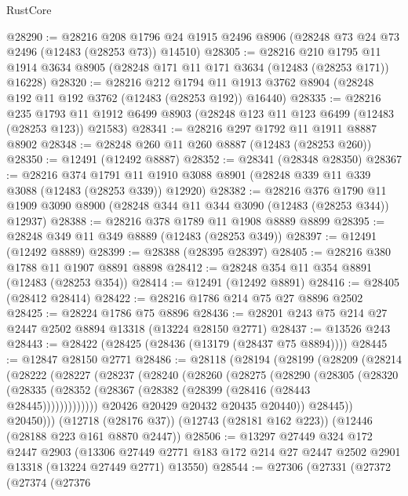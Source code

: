 \begin{lexlean}{RustCore}
\begin{coremodule}
@28290 := @28216
    @208
    @1796
    @24
    @1915
    @2496
    @8906
    (@28248 @73 @24 @73 @2496 (@12483 (@28253 @73)) @14510)
@28305 := @28216
    @210
    @1795
    @11
    @1914
    @3634
    @8905
    (@28248 @171 @11 @171 @3634 (@12483 (@28253 @171)) @16228)
@28320 := @28216
    @212
    @1794
    @11
    @1913
    @3762
    @8904
    (@28248 @192 @11 @192 @3762 (@12483 (@28253 @192)) @16440)
@28335 := @28216
    @235
    @1793
    @11
    @1912
    @6499
    @8903
    (@28248 @123 @11 @123 @6499 (@12483 (@28253 @123)) @21583)
@28341 := @28216 @297 @1792 @11 @1911 @8887 @8902
@28348 := @28248 @260 @11 @260 @8887 (@12483 (@28253 @260))
@28350 := @12491 (@12492 @8887)
@28352 := @28341 (@28348 @28350)
@28367 := @28216
    @374
    @1791
    @11
    @1910
    @3088
    @8901
    (@28248 @339 @11 @339 @3088 (@12483 (@28253 @339)) @12920)
@28382 := @28216
    @376
    @1790
    @11
    @1909
    @3090
    @8900
    (@28248 @344 @11 @344 @3090 (@12483 (@28253 @344)) @12937)
@28388 := @28216 @378 @1789 @11 @1908 @8889 @8899
@28395 := @28248 @349 @11 @349 @8889 (@12483 (@28253 @349))
@28397 := @12491 (@12492 @8889)
@28399 := @28388 (@28395 @28397)
@28405 := @28216 @380 @1788 @11 @1907 @8891 @8898
@28412 := @28248 @354 @11 @354 @8891 (@12483 (@28253 @354))
@28414 := @12491 (@12492 @8891)
@28416 := @28405 (@28412 @28414)
@28422 := @28216 @1786 @214 @75 @27 @8896 @2502
@28425 := @28224 @1786 @75 @8896
@28436 := @28201 @243 @75 @214 @27 @2447 @2502 @8894 @13318 (@13224 @28150 @2771)
@28437 := @13526 @243
@28443 := @28422 (@28425 (@28436 (@13179 (@28437 @75 @8894))))
@28445 := @12847 @28150 @2771
@28486 := @28118
    (@28194
      (@28199
        (@28209
          (@28214
            (@28222
              (@28227
                (@28237
                  (@28240
                    (@28260
                      (@28275
                        (@28290
                          (@28305
                            (@28320
                              (@28335
                                (@28352 (@28367 (@28382 (@28399 (@28416 (@28443 @28445)))))))))))))
                  @20426
                  @20429
                  @20432
                  @20435
                  @20440))
              @28445))
          @20450)))
    (@12718 (@28176 @37))
    (@12743 (@28181 @162 @223))
    (@12446 (@28188 @223 @161 @8870 @2447))
@28506 := @13297
    @27449
    @324
    @172
    @2447
    @2903
    (@13306 @27449 @2771 @183 @172 @214 @27 @2447 @2502 @2901 @13318 (@13224 @27449 @2771) @13550)
@28544 := @27306
    (@27331
      (@27372
        (@27374
          (@27376

\end{coremodule}
\end{lexlean}

